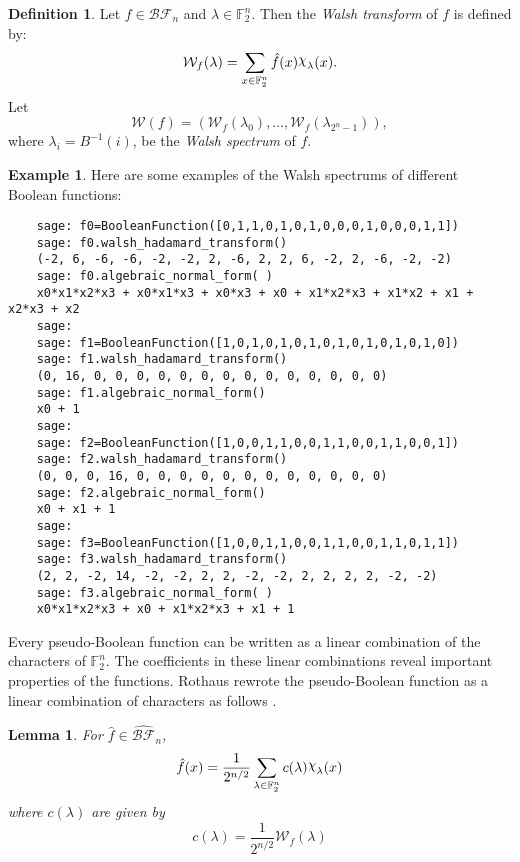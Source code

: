 \documentclass[english]{article}
\def\gftwo{\mathbb{F}_2}
\def\BF{\mathcal{BF}}
\def\Chi{\raisebox{2pt}{$\chi$}}
\theoremstyle{plain}
\newtheorem{lemma}[theorem]{Lemma}%
\theoremstyle{definition}
\newtheorem{definition}[theorem]{Definition}%
\newtheorem{example}[theorem]{Example}
\theoremstyle{remark}
\begin{document}
\begin{definition}\label{def:walsh}
  Let $f\in\BF_n$ and $\lambda\in\gftwo^n$. Then the {\em Walsh transform}
  of $f$ is defined by:
  \begin{equation}\label{eqn:walsh}
    \mathcal{W}_f(\lambda)=\sum_{x\in\gftwo^n}\hat{f}(x)\Chi_\lambda(x).
  \end{equation}
  Let
  \[
    \mathcal{W}(f)=(\mathcal{W}_f(\lambda_0),\dots,\mathcal{W}_f(\lambda_{2^n-1})),
  \]
  where $\lambda_i=B^{-1}(i)$, be the {\it Walsh spectrum} of $f$.
\end{definition}

\begin{example}
\par Here are some examples of the Walsh spectrums of different Boolean
functions:
  \begin{lstlisting}
    sage: f0=BooleanFunction([0,1,1,0,1,0,1,0,0,0,1,0,0,0,1,1])
    sage: f0.walsh_hadamard_transform()
    (-2, 6, -6, -6, -2, -2, 2, -6, 2, 2, 6, -2, 2, -6, -2, -2)
    sage: f0.algebraic_normal_form( )
    x0*x1*x2*x3 + x0*x1*x3 + x0*x3 + x0 + x1*x2*x3 + x1*x2 + x1 + x2*x3 + x2
    sage:
    sage: f1=BooleanFunction([1,0,1,0,1,0,1,0,1,0,1,0,1,0,1,0])
    sage: f1.walsh_hadamard_transform()
    (0, 16, 0, 0, 0, 0, 0, 0, 0, 0, 0, 0, 0, 0, 0, 0)
    sage: f1.algebraic_normal_form()
    x0 + 1
    sage:
    sage: f2=BooleanFunction([1,0,0,1,1,0,0,1,1,0,0,1,1,0,0,1])
    sage: f2.walsh_hadamard_transform()
    (0, 0, 0, 16, 0, 0, 0, 0, 0, 0, 0, 0, 0, 0, 0, 0)
    sage: f2.algebraic_normal_form()
    x0 + x1 + 1
    sage:
    sage: f3=BooleanFunction([1,0,0,1,1,0,0,1,1,0,0,1,1,0,1,1])
    sage: f3.walsh_hadamard_transform()
    (2, 2, -2, 14, -2, -2, 2, 2, -2, -2, 2, 2, 2, 2, -2, -2)
    sage: f3.algebraic_normal_form( )
    x0*x1*x2*x3 + x0 + x1*x2*x3 + x1 + 1
  \end{lstlisting}
\end{example}

\par 
\par Every pseudo-Boolean function can be written as a linear combination of
the characters of $\gftwo^n$. The coefficients in these linear combinations
reveal important properties of the functions. Rothaus rewrote the
pseudo-Boolean function as a linear combination of characters
as follows \cite{art:r76}. 

\begin{lemma}
  For $\hat{f}\in\hat{\BF}_n$,
\begin{equation}\label{eqn:rewrite-pseudo}
  \hat{f}(x)
    =\frac{1}{2^{n/2}}
      \sum_{\lambda\in\gftwo^n}c(\lambda)\Chi_\lambda(x)
\end{equation}
  where $c(\lambda)$ are given by
  \begin{equation}\label{eqn:clambda}
    c(\lambda)=\frac{1}{2^{n/2}}\mathcal{W}_f(\lambda)
  \end{equation}
\end{lemma}
\end{document}
